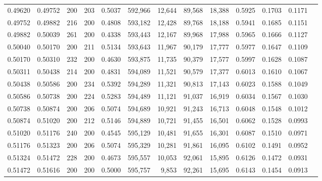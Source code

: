 \begin{tabular}{rrrrrrrrrrrrr}
0.49620 & 0.49752 &    200 & 203 &                                     0.5037 & 592,966 &  12,644 &  89,568 &  18,388 & 0.5925 & 0.1703 & 0.1171 \\
0.49752 & 0.49882 &    216 & 200 &                                     0.4808 & 593,182 &  12,428 &  89,768 &  18,188 & 0.5941 & 0.1685 & 0.1151 \\
0.49882 & 0.50039 &    261 & 200 &                                     0.4338 & 593,443 &  12,167 &  89,968 &  17,988 & 0.5965 & 0.1666 & 0.1127 \\
0.50040 & 0.50170 &    200 & 211 &                                     0.5134 & 593,643 &  11,967 &  90,179 &  17,777 & 0.5977 & 0.1647 & 0.1109 \\
0.50170 & 0.50310 &    232 & 200 &                                     0.4630 & 593,875 &  11,735 &  90,379 &  17,577 & 0.5997 & 0.1628 & 0.1087 \\
0.50311 & 0.50438 &    214 & 200 &                                     0.4831 & 594,089 &  11,521 &  90,579 &  17,377 & 0.6013 & 0.1610 & 0.1067 \\
0.50438 & 0.50586 &    200 & 234 &                                     0.5392 & 594,289 &  11,321 &  90,813 &  17,143 & 0.6023 & 0.1588 & 0.1049 \\
0.50586 & 0.50738 &    200 & 224 &                                     0.5283 & 594,489 &  11,121 &  91,037 &  16,919 & 0.6034 & 0.1567 & 0.1030 \\
0.50738 & 0.50874 &    200 & 206 &                                     0.5074 & 594,689 &  10,921 &  91,243 &  16,713 & 0.6048 & 0.1548 & 0.1012 \\
0.50874 & 0.51020 &    200 & 212 &                                     0.5146 & 594,889 &  10,721 &  91,455 &  16,501 & 0.6062 & 0.1528 & 0.0993 \\
0.51020 & 0.51176 &    240 & 200 &                                     0.4545 & 595,129 &  10,481 &  91,655 &  16,301 & 0.6087 & 0.1510 & 0.0971 \\
0.51176 & 0.51323 &    200 & 206 &                                     0.5074 & 595,329 &  10,281 &  91,861 &  16,095 & 0.6102 & 0.1491 & 0.0952 \\
0.51324 & 0.51472 &    228 & 200 &                                     0.4673 & 595,557 &  10,053 &  92,061 &  15,895 & 0.6126 & 0.1472 & 0.0931 \\
0.51472 & 0.51616 &    200 & 200 &                                     0.5000 & 595,757 &   9,853 &  92,261 &  15,695 & 0.6143 & 0.1454 & 0.0913 \\

\end{tabular}
